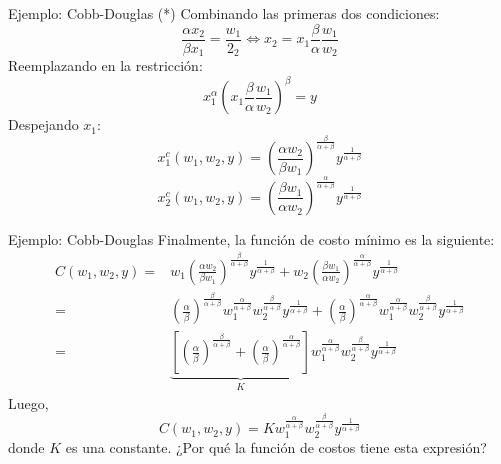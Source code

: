 \documentclass{beamer}
\theoremstyle{definition}
\begin{document}
\begin{frame}[noframenumbering]{Ejemplo: Cobb-Douglas (*)}
\color{gray}
Combinando las primeras dos condiciones:
\begin{equation*}
\frac{\alpha x_{2}}{\beta x_{1}}=\frac{w_{1}}{2_{2}}\Longleftrightarrow x_{2}=x_{1}\frac{\beta}{\alpha}\frac{w_{1}}{w_{2}}
\end{equation*}
Reemplazando en la restricci\'on:
\begin{equation*}
x^{\alpha}_{1}\left(x_{1}\frac{\beta}{\alpha}\frac{w_{1}}{w_{2}}\right)^{\beta}=y
\end{equation*}
Despejando $x_{1}$:
\begin{equation*}
x^{c}_{1}(w_{1},w_{2},y)=\left(\frac{\alpha w_{2}}{\beta w_{1}}\right)^{\frac{\beta}{\alpha+\beta}}y^{\frac{1}{\alpha+\beta}}
\end{equation*}
\begin{equation*}
x^{c}_{2}(w_{1},w_{2},y)=\left(\frac{\beta w_{1}}{\alpha w_{2}}\right)^{\frac{\alpha}{\alpha+\beta}}y^{\frac{1}{\alpha+\beta}}
\end{equation*}
\end{frame}

\begin{frame}[noframenumbering]{Ejemplo: Cobb-Douglas}
\color{gray}
Finalmente, la funci\'on de costo m\'inimo es la siguiente:
\begin{align*}
C(w_{1},w_{2},y)=&w_{1}\left(\frac{\alpha w_{2}}{\beta w_{1}}\right)^{\frac{\beta}{\alpha+\beta}}y^{\frac{1}{\alpha+\beta}}+w_{2}\left(\frac{\beta w_{1}}{\alpha w_{2}}\right)^{\frac{\alpha}{\alpha+\beta}}y^{\frac{1}{\alpha+\beta}}\\
=&\left(\frac{\alpha}{\beta}\right)^{\frac{\beta}{\alpha+\beta}}w^{\frac{\alpha}{\alpha+\beta}}_{1}w^{\frac{\beta}{\alpha+\beta}}_{2}y^{\frac{1}{\alpha+\beta}}+\left(\frac{\alpha}{\beta}\right)^{\frac{\alpha}{\alpha+\beta}}w^{\frac{\alpha}{\alpha+\beta}}_{1}w^{\frac{\beta}{\alpha+\beta}}_{2}y^{\frac{1}{\alpha+\beta}}\\
=&\underbrace{\left[\left(\frac{\alpha}{\beta}\right)^{\frac{\beta}{\alpha+\beta}}+\left(\frac{\alpha}{\beta}\right)^{\frac{\alpha}{\alpha+\beta}}\right]}_{K}w^{\frac{\alpha}{\alpha+\beta}}_{1}w^{\frac{\beta}{\alpha+\beta}}_{2}y^{\frac{1}{\alpha+\beta}}
\end{align*}
Luego,
\begin{equation*}
C(w_{1},w_{2},y)=Kw^{\frac{\alpha}{\alpha+\beta}}_{1}w^{\frac{\beta}{\alpha+\beta}}_{2}y^{\frac{1}{\alpha+\beta}}
\end{equation*}	
donde $K$ es una constante. ¿Por qué la función de costos tiene esta expresión?
\end{frame}
\end{document}
